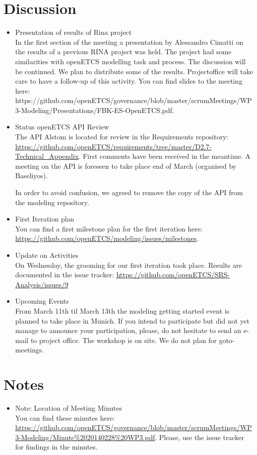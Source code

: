 \documentclass[a4paper, 11pt]{article}
\begin{document}
\section{Discussion}
\begin{itemize}
\item Presentation of results of Rina project\\
In the first section of the meeting a presentation by Alessandro Cimatti on the results of a previous RINA project was held. The project had some similarities with openETCS modelling task and process. The discussion will be continued. We plan to distribute  some of the results. Projectoffice will take care to have a follow-up of this activity.  
You can find slides to the meeting here: {https://github.com/openETCS/governance/blob/master/scrumMeetings/WP3-Modeling/Presentations/FBK-ES-OpenETCS.pdf}.

\item Status openETCS API Review\\
The API Alstom is located for review in the Requirements repository: \url{https://github.com/openETCS/requirements/tree/master/D2.7-Technical_Appendix}. First comments have been received in the meantime. A meeting on the API is foreseen to take place end of March (organised by Baseliyos).

In order to avoid confusion, we agreed to remove the copy of the API from the modeling repository.

\item First Iteration plan\\
You can find a first milestone plan for the first iteration here:
\url{https://github.com/openETCS/modeling/issues/milestones}. 

\item Update on Activities\\
On Wednesday, the grooming for our first iteration took place. Results are documented in the issue tracker: \url{https://github.com/openETCS/SRS-Analysis/issues/9}

\item Upcoming Events\\
From March 11th til March 13th the modeling getting started event is planned to take place in Munich. If you intend to participate but did not yet manage to announce your participation, please, do not hesitate to send an e-mail to project office. The workshop is on site. We do not plan for goto-meetings.

\end{itemize}

\section{Notes}
\begin{itemize}

\item Note: Location of Meeting Minutes\\
You can find these minutes here: \url{https://github.com/openETCS/governance/blob/master/scrumMeetings/WP3-Modeling/Minute%2020140228%20WP3.pdf}. Please, use the issue tracker for findings in the minutes.
\end{itemize}
\end{document}
